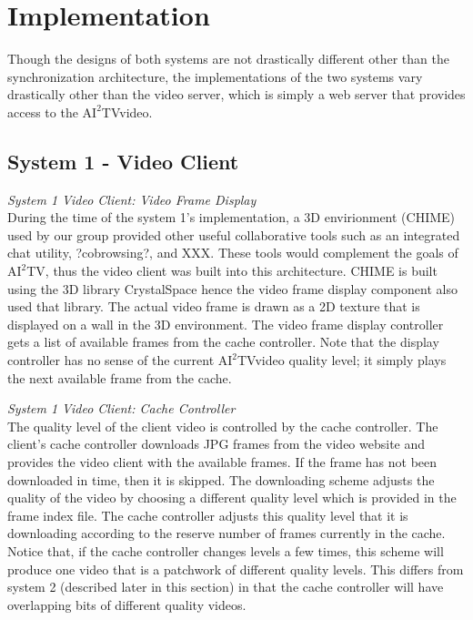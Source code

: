 \documentclass[10pt]{article}
\newcommand{\aiitv}[0]{$\mathrm{AI}^2$TV}
\begin{document}
\section{Implementation} \label{implementation}

Though the designs of both systems are not drastically different other
than the synchronization architecture, the implementations of the two
systems vary drastically other than the video server, which is simply
a web server that provides access to the \aiitv video.

\subsection{System 1 - Video Client}

\textit{System 1 Video Client: Video Frame Display}  \\
During the time of the system 1's implementation, a 3D envirionment
(CHIME) used by our group provided other useful collaborative tools
such as an integrated chat utility, ?cobrowsing?, and XXX.  These
tools would complement the goals of \aiitv, thus the video client was
built into this architecture.  CHIME is built using the 3D library
CrystalSpace \cite{crystalspace} hence the video frame display
component also used that library.  The actual video frame is drawn as
a 2D texture that is displayed on a wall in the 3D environment.  The
video frame display controller gets a list of available frames from the
cache controller.  Note that the display controller has no sense of
the current \aiitv video quality level; it simply plays the next
available frame from the cache.

\textit{System 1 Video Client: Cache Controller}  \\
The quality level of the client video is controlled by the cache
controller.  The client's cache controller downloads JPG frames from
the video website and provides the video client with the available
frames.  If the frame has not been downloaded in time, then it is
skipped.  The downloading scheme adjusts the quality of the video by
choosing a different quality level which is provided in the frame
index file.  The cache controller adjusts this quality level that it
is downloading according to the reserve number of frames currently in
the cache.  Notice that, if the cache controller changes levels a few
times, this scheme will produce one video that is a patchwork of
different quality levels.  This differs from system 2 (described later
in this section) in that the cache controller will have overlapping
bits of different quality videos.
\end{document}
